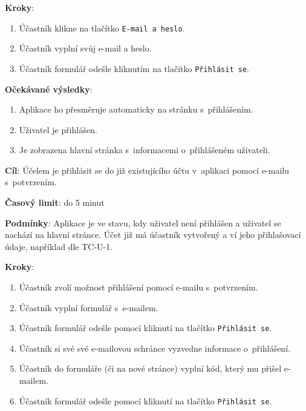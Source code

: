 \textbf{Kroky}:

\begin{enumerate}[leftmargin=1.4cm]
    \item Účastník klikne na tlačítko \verb|E-mail a heslo|.
    \item Účastník vyplní svůj e-mail a heslo.
    \item Účastník formulář odešle kliknutím na tlačítko \verb|Přihlásit se|.
\end{enumerate}

\textbf{Očekávané výsledky}:

\begin{enumerate}[leftmargin=1.4cm]
    \item Aplikace ho přesměruje automaticky na stránku s~přihlášením.
    \item Uživatel je přihlášen.
    \item Je zobrazena hlavní stránka s~informacemi o~přihlášeném uživateli.
\end{enumerate}


\vspace{1em}

\textbf{Cíl}: Účelem je přihlásit se do již existujícího účtu v~aplikaci pomocí e-mailu s~potvrzením.

\textbf{Časový limit}: do 5 minut

\textbf{Podmínky}: Aplikace je ve stavu, kdy uživatel není přihlášen a uživatel se nachází na hlavní stránce. Účet již má účastník vytvořený a ví jeho přihlašovací údaje, například dle TC-U-1.

\textbf{Kroky}:

\begin{enumerate}[leftmargin=1.4cm]
    \item Účastník zvolí možnost přihlášení pomocí e-mailu s~potvrzením.
    \item Účastník vyplní formulář s~e-mailem.
    \item Účastník formulář odešle pomocí kliknutí na tlačítko \verb|Přihlásit se|.
    \item Účastník si své své e-mailovou schránce vyzvedne informace o~přihlášení.
    \item Účastník do formuláře (či na nové stránce) vyplní kód, který mu přišel e-mailem.
    \item Účastník formulář odešle pomocí kliknutí na tlačítko \verb|Přihlásit se|.
\end{enumerate}

